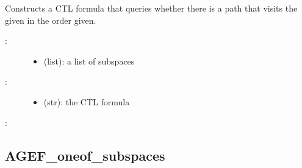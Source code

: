 \documentclass[letterpaper,10pt,english]{sphinxmanual}
\begin{document}
\begin{fulllineitems}
\label{\detokenize{TemporalLogic:PyBoolNet.TemporalLogic.EF_nested_reachability}}
Constructs a CTL formula that queries whether there is a path that visits the given  in the order given.
\begin{description}
\item[{:}] \leavevmode\begin{itemize}
\item {} 
 (list): a list of subspaces

\end{itemize}

\item[{:}] \leavevmode\begin{itemize}
\item {} 
 (str): the CTL formula

\end{itemize}

\end{description}

:

\begin{sphinxVerbatim}[commandchars=\\\{\}]
  \PYG{p}{[} \PYG{p}{]}
\end{sphinxVerbatim}

\end{fulllineitems}



\subsection{AGEF\_oneof\_subspaces}
\label{\detokenize{TemporalLogic:agef-oneof-subspaces}}
\end{document}
